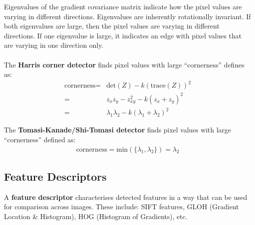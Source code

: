 \documentclass[a4paper,11pt]{article}
\begin{document}
Eigenvalues of the gradient covariance matrix indicate how the pixel values are varying in different directions.
Eigenvalues are inherently rotationally invariant.
If both eigenvalues are large, then the pixel values are varying in different directions.
If one eigenvalue is large, it indicates an edge with pixel values that are varying in one direction only.
\\\\
The \textbf{Harris corner detector} finds pixel values with large ``cornerness'' defines as:
\begin{align*}
    \text{cornerness} =& \text{det}(Z) - k (\text{trace}(Z))^2 \\
    =& z_x z_y - z_{xy}^2 - k (z_x + z_y)^2 \\
    =& \lambda_1 \lambda_2 - k(\lambda_1 + \lambda_2)^2
\end{align*}

The \textbf{Tomasi-Kanade/Shi-Tomasi detector} finds pixel values with large ``cornerness'' defined as:
\begin{align*}
    \text{cornerness} = \text{min}( \{ \lambda_1, \lambda_2 \}) = \lambda_2
\end{align*}

\subsection{Feature Descriptors}
A \textbf{feature descriptor} characterises detected features in a way that can be used for comparison across images.
These include: SIFT features, GLOH (Gradient Location \& Histogram), HOG (Histogram of Gradients), etc.
\end{document}
